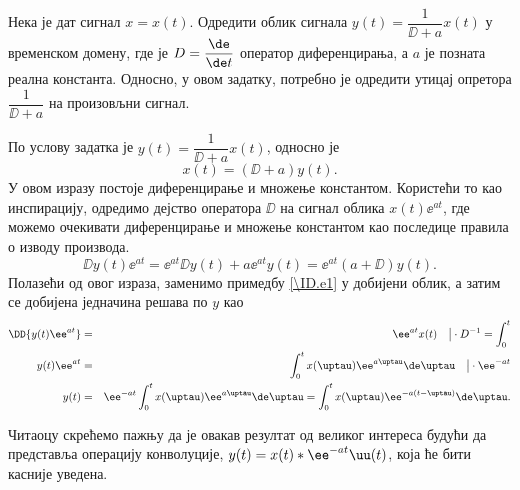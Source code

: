 \PID Нека је дат сигнал $x = x(t)$. Одредити облик сигнала $y(t) = \dfrac{1}{\DD + a}x(t)$ у временском домену, где је 
$D = \dfrac{\de}{\de t}$ оператор диференцирања, а $a$ је позната реална константа. Односно, у овом задатку, потребно је 
одредити утицај опретора $\dfrac{1}{\DD + a}$ на произовљни сигнал.

\RESENJE
По услову задатка је 
$y(t) = \dfrac{1}{\DD + a}x(t)$, 
 односно је 
\begin{equation}
x(t) = (\DD + a) y(t). \label{\ID.e1}
\end{equation} 
У овом изразу постоје диференцирање и множење константом. Користећи то као инспирацију, одредимо дејство 
оператора $\DD$ на сигнал облика $x(t) \ee^{at}$, где можемо очекивати диференцирање и множење константом као последице правила о изводу производа. 
\begin{equation}
    \DD{ y(t) \ee^{at} } = \ee^{at} \DD y(t) + a \ee^{at} y(t) = \ee^{at} (a + \DD) y(t).
\end{equation}
Полазећи од овог израза, заменимо примедбу \ref{\ID.e1} у добијени облик, а затим се добијена једначина решава по $y$ као 
\begin{eqnarray}
    \DD{ y(t) \ee^{at} } &=& \ee^{at} x(t) \quad \big| \cdot D^{-1} = \int_{0}^{t} \\
    y(t) \ee^{at} &=& \int_{0}^{t} x(\uptau) \ee^{a\uptau}\de \uptau \quad \big| \cdot \ee^{-at} \\
    y(t) &=& \ee^{-at} \int_{0}^{t} x(\uptau) \ee^{a\uptau}\de \uptau = 
         \int_{0}^{t} x(\uptau) \ee^{-a(t - \uptau) }  \de \uptau.
\end{eqnarray}

Читаоцу скрећемо пажњу да је овакав резултат од великог интереса будући да представља операцију конволуције, 
$y(t) = x(t) \ast \ee^{-at} \uu(t)$, која ће бити касније уведена. 
